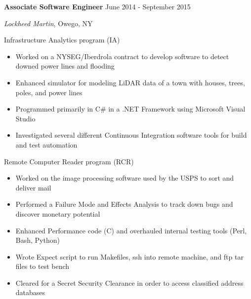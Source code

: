 

\vspace{5pt}

\textbf{Associate Software Engineer} \hfill June 2014 - September 2015

\textit{Lockheed Martin}, Owego, NY

\vspace{3pt}

Infrastructure Analytics program (IA)

\begin{itemize}
    \item Worked on a NYSEG/Iberdrola contract to develop software to detect downed power lines and flooding
    \item Enhanced simulator for modeling LiDAR data of a town with houses, trees, poles, and power lines
    \item Programmed primarily in C\# in a .NET Framework using Microsoft Visual Studio
    \item Investigated several different Continuous Integration software tools for build and test automation
\end{itemize}

\vspace{3pt}

Remote Computer Reader program (RCR)

\begin{itemize}
    \item Worked on the image processing software used by the USPS to sort and deliver mail
    \item Performed a Failure Mode and Effects Analysis to track down bugs and discover monetary potential
    \item Enhanced Performance code (C) and overhauled internal testing tools (Perl, Bash, Python)
    \item Wrote Expect script to run Makefiles, ssh into remote machine, and ftp tar files to test bench
    \item Cleared for a Secret Security Clearance in order to access classified address databases
\end{itemize}
